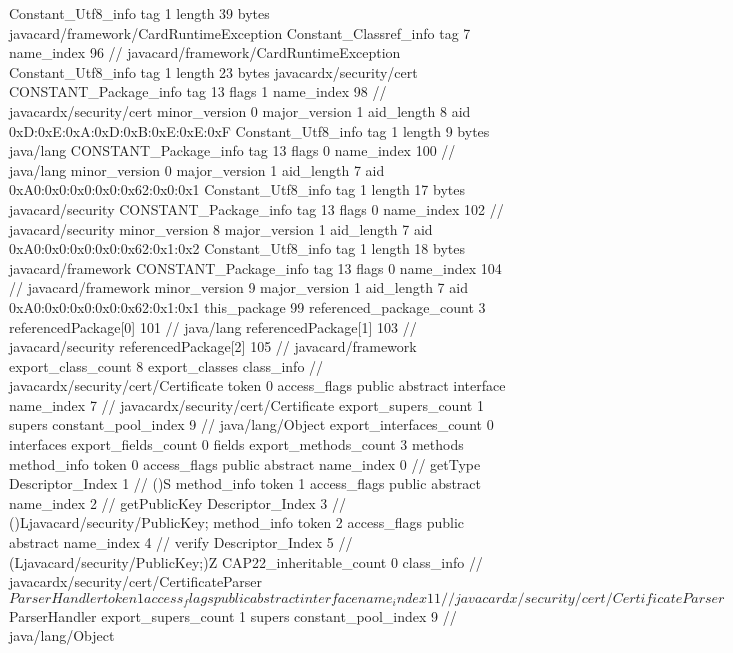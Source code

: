 {{		Constant_Utf8_info {
			tag	1
			length	39
			bytes	javacard/framework/CardRuntimeException
		}
		Constant_Classref_info {
			tag	7
			name_index	96		// javacard/framework/CardRuntimeException
		}
		Constant_Utf8_info {
			tag	1
			length	23
			bytes	javacardx/security/cert
		}
		CONSTANT_Package_info {
			tag	13
			flags	1
			name_index	98		// javacardx/security/cert
			minor_version	0
			major_version	1
			aid_length	8
			aid	0xD:0xE:0xA:0xD:0xB:0xE:0xE:0xF
		}
		Constant_Utf8_info {
			tag	1
			length	9
			bytes	java/lang
		}
		CONSTANT_Package_info {
			tag	13
			flags	0
			name_index	100		// java/lang
			minor_version	0
			major_version	1
			aid_length	7
			aid	0xA0:0x0:0x0:0x0:0x62:0x0:0x1
		}
		Constant_Utf8_info {
			tag	1
			length	17
			bytes	javacard/security
		}
		CONSTANT_Package_info {
			tag	13
			flags	0
			name_index	102		// javacard/security
			minor_version	8
			major_version	1
			aid_length	7
			aid	0xA0:0x0:0x0:0x0:0x62:0x1:0x2
		}
		Constant_Utf8_info {
			tag	1
			length	18
			bytes	javacard/framework
		}
		CONSTANT_Package_info {
			tag	13
			flags	0
			name_index	104		// javacard/framework
			minor_version	9
			major_version	1
			aid_length	7
			aid	0xA0:0x0:0x0:0x0:0x62:0x1:0x1
		}
	}
	this_package	99
	referenced_package_count	3
	referencedPackage[0]	101		// java/lang
	referencedPackage[1]	103		// javacard/security
	referencedPackage[2]	105		// javacard/framework
	export_class_count	8
	export_classes {
		class_info {		// javacardx/security/cert/Certificate
			token	0
			access_flags	public abstract interface
			name_index	7		// javacardx/security/cert/Certificate
			export_supers_count	1
			supers {
				constant_pool_index	9		// java/lang/Object
			}
			export_interfaces_count	0
			interfaces {
			}
			export_fields_count	0
			fields {
			}
			export_methods_count	3
			methods {
				method_info {
					token	0
					access_flags	public abstract
					name_index	0		// getType
					Descriptor_Index	1		// ()S
				}
				method_info {
					token	1
					access_flags	public abstract
					name_index	2		// getPublicKey
					Descriptor_Index	3		// ()Ljavacard/security/PublicKey;
				}
				method_info {
					token	2
					access_flags	public abstract
					name_index	4		// verify
					Descriptor_Index	5		// (Ljavacard/security/PublicKey;)Z
				}
			}
			CAP22_inheritable_count	0
		}
		class_info {		// javacardx/security/cert/CertificateParser$ParserHandler
			token	1
			access_flags	public abstract interface
			name_index	11		// javacardx/security/cert/CertificateParser$ParserHandler
			export_supers_count	1
			supers {
				constant_pool_index	9		// java/lang/Object
}}}}
